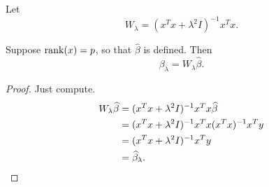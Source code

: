 \documentclass[12pt]{amsart}
\begin{document}
Let
\[
    W_\lambda = (x^Tx + \lambda^2I)^{-1}x^Tx.
\]

\begin{theorem}
    Suppose $\rank(x)=p$, so that $\hat\beta$ is defined. Then
    \[
        \beta_\lambda = W_\lambda\hat\beta.
    \]
\end{theorem}

\begin{proof} Just compute.
    \begin{align*}
        W_\lambda\hat\beta
        &= (x^Tx + \lambda^2I)^{-1}x^Tx\hat\beta\\
        &= (x^Tx + \lambda^2I)^{-1}x^Tx(x^Tx)^{-1}x^T y\\
        &= (x^Tx + \lambda^2I)^{-1}x^T y\\
        &= \hat\beta_\lambda.\qedhere
    \end{align*}
\end{proof}
\end{document}
